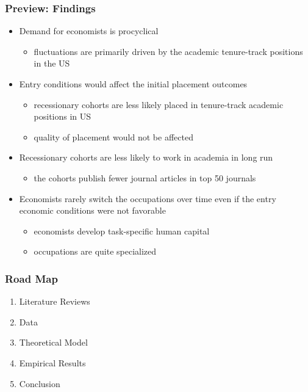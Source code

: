 \documentclass[11pt]{beamer}
\begin{document}
\begin{frame}
	\frametitle{Preview: Findings}
	\begin{itemize}
			\item Demand for economists is procyclical
			\begin{itemize}
				\item fluctuations are primarily driven by the academic tenure-track positions in the US
			\end{itemize}
			\vspace{1mm}
			\item Entry conditions would affect the initial placement outcomes
			\begin{itemize}
				\item  recessionary cohorts are less likely placed in tenure-track academic positions in US
				\item quality of placement would not be affected
			\end{itemize}
			\vspace{1mm}
			\item Recessionary cohorts are less likely to work in academia in {\small  long run}
			\begin{itemize}
				\item the cohorts publish fewer journal articles in top 50 journals
			\end{itemize}
			\vspace{1mm}
			\item Economists rarely switch the occupations over time even if the entry economic conditions were not favorable
			\begin{itemize}
				\item economists develop task-specific human capital
				\item occupations are quite specialized
			\end{itemize}
	\end{itemize}
\end{frame}


\begin{frame}
	\frametitle{Road Map}
\begin{enumerate}
	\item Literature Reviews
	\vspace{2.6 mm}
	\item Data
	\vspace{2.6 mm}
	\item Theoretical Model
	\vspace{2.6 mm}  
	\item Empirical Results
	\vspace{2.6 mm}  
	\item Conclusion
\end{enumerate}

\end{frame}
\end{document}
